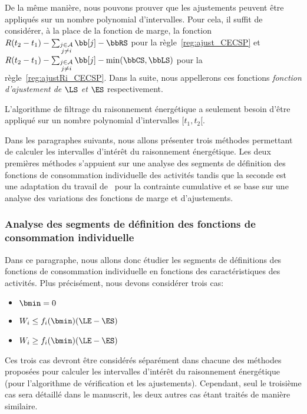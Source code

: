De la même manière, nous pouvons prouver que les ajustements
peuvent être appliqués sur un nombre polynomial d'intervalles. Pour
cela, il suffit de considérer, à la place de la fonction de marge, la
fonction $ R(t_2-t_1) - \sum_{\substack{j \in \A\\ j \neq i}} \bb[j] -
\bbRS$ pour la règle~\ref{reg:ajust_CECSP} et $ R(t_2-t_1) - \sum_{\substack{j \in
    \A\\ j \neq i}} \bb[j] - \min(\bbCS,\bbLS)$ pour la
règle~\ref{reg:ajustRi_CECSP}. Dans la suite, nous appellerons ces
fonctions {\it fonction d'ajustement de $\LS$ et $\ES$} respectivement. 

\begin{theo}
  L'algorithme de filtrage du raisonnement énergétique a seulement
  besoin d'être appliqué sur un nombre polynomial d'intervalles $[t_1,t_2[$.
\end{theo}

Dans les paragraphes suivants, nous allons présenter trois méthodes
permettant de calculer les intervalles d'intérêt du raisonnement
énergétique. Les deux premières méthodes s'appuient sur une analyse
des segments de définition des fonctions de consommation individuelle
des activités tandis que la seconde est une adaptation du travail
de~\cite{DP} pour la contrainte cumulative et se base sur une analyse
des variations des fonctions de marge et d'ajustements.

\subsubsection{Analyse des segments de définition des fonctions de 
  consommation individuelle}

Dans ce paragraphe, nous allons donc étudier les segments de
définitions des fonctions de consommation individuelle en fonctions
des caractéristiques des activités. Plus précisément, nous devons
considérer trois cas:
\begin{itemize}
\item $\bmin=0$
\item $W_i \le f_i(\bmin)(\LE-\ES)$
\item $W_i \ge f_i(\bmin)(\LE-\ES)$
\end{itemize}
Ces trois cas devront être considérés séparément dans chacune des
méthodes proposées pour calculer les intervalles d'intérêt du
raisonnement énergétique (pour l'algorithme de vérification et les
ajustements). Cependant, seul le troisième cas sera détaillé dans
le manuscrit, les deux autres cas étant traités de manière similaire. 

